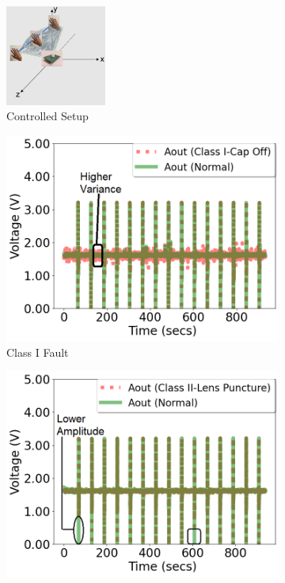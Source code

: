 \begin{figure}[b]
	\centering
	\begin{subfigure}[b]{0.3\textwidth}
		\centering
		\includegraphics[scale=0.6, height=1.3in]{figures/platform/controlled_setup-2.png}
		\caption{Controlled Setup}
		\label{fig:pir_sensor_controlled}
	\end{subfigure}%
	\begin{subfigure}[t]{0.3\textwidth}
		\centering
		\includegraphics[width=\textwidth]{figures/2-PIR-Fault/normal-classI/classI_compared-again.png}
		\caption{Class I Fault}
		\label{fig:pir_sensor_controlled_a}
	\end{subfigure}%
	\begin{subfigure}[t]{0.3\textwidth}
		\centering
		\includegraphics[width=\textwidth]{figures/2-PIR-Fault/normal-classII/classII_compared.png}

\end{subfigure}
\end{figure}
